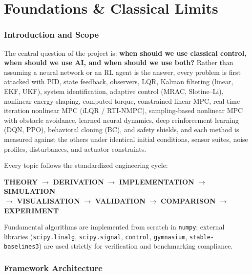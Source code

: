 \documentclass[11pt,a4paper]{article}
\begin{document}
\newpage


\part{Foundations \& Classical Limits}

\section{Introduction and Scope}

The central question of the project is: \textbf{when should we use classical
control, when should we use AI, and when should we use both?} Rather than
assuming a neural network or an RL agent is the answer, every problem is first
attacked with PID, state feedback, observers, LQR, Kalman filtering (linear, EKF, UKF),
system identification, adaptive control (MRAC, Slotine--Li), nonlinear energy shaping,
computed torque, constrained linear MPC, real-time iteration nonlinear MPC (iLQR / RTI-NMPC),
sampling-based nonlinear MPC with obstacle avoidance, learned neural dynamics, deep
reinforcement learning (DQN, PPO), behavioral cloning (BC), and safety shields, and each method is measured
against the others under identical initial conditions, sensor suites, noise profiles,
disturbances, and actuator constraints.

Every topic follows the standardized engineering cycle:
\begin{center}
\textbf{THEORY} $\longrightarrow$ \textbf{DERIVATION} $\longrightarrow$ \textbf{IMPLEMENTATION} $\longrightarrow$ \textbf{SIMULATION}\\
$\longrightarrow$ \textbf{VISUALISATION} $\longrightarrow$ \textbf{VALIDATION} $\longrightarrow$ \textbf{COMPARISON} $\longrightarrow$ \textbf{EXPERIMENT}
\end{center}

Fundamental algorithms are implemented from scratch in \texttt{numpy}; external
libraries (\texttt{scipy.linalg}, \texttt{scipy.signal}, \texttt{control}, \texttt{gymnasium},
\texttt{stable-baselines3}) are used strictly for verification and benchmarking compliance.

\section{Framework Architecture}
\end{document}
